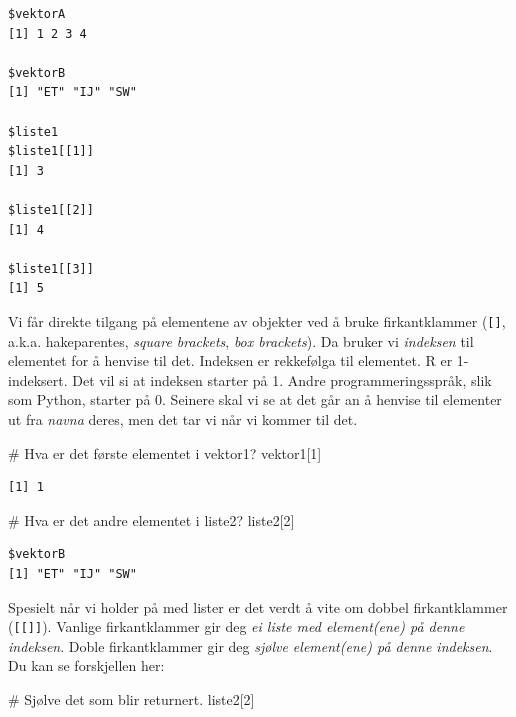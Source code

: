 \documentclass[
  letterpaper,
  DIV=11,
  numbers=noendperiod]{scrreprt}
\newenvironment{Shaded}{\begin{snugshade}}{\end{snugshade}}
\newcommand{\CommentTok}[1]{\textcolor[rgb]{0.37,0.37,0.37}{#1}}
\newcommand{\DecValTok}[1]{\textcolor[rgb]{0.68,0.00,0.00}{#1}}
\newcommand{\NormalTok}[1]{\textcolor[rgb]{0.00,0.23,0.31}{#1}}
\begin{document}
\begin{verbatim}
$vektorA
[1] 1 2 3 4

$vektorB
[1] "ET" "IJ" "SW"

$liste1
$liste1[[1]]
[1] 3

$liste1[[2]]
[1] 4

$liste1[[3]]
[1] 5
\end{verbatim}

Vi får direkte tilgang på elementene av objekter ved å bruke
firkantklammer (\texttt{{[}{]}}, a.k.a. hakeparentes, \emph{square
brackets}, \emph{box brackets}). Da bruker vi \emph{indeksen} til
elementet for å henvise til det. Indeksen er rekkefølga til elementet. R
er 1-indeksert. Det vil si at indeksen starter på 1. Andre
programmeringsspråk, slik som Python, starter på 0. Seinere skal vi se
at det går an å henvise til elementer ut fra \emph{navna} deres, men det
tar vi når vi kommer til det.

\begin{Shaded}
\begin{Highlighting}[]
\CommentTok{\# Hva er det første elementet i vektor1?}
\NormalTok{vektor1[}\DecValTok{1}\NormalTok{]}
\end{Highlighting}
\end{Shaded}

\begin{verbatim}
[1] 1
\end{verbatim}

\begin{Shaded}
\begin{Highlighting}[]
\CommentTok{\# Hva er det andre elementet i liste2?}
\NormalTok{liste2[}\DecValTok{2}\NormalTok{]}
\end{Highlighting}
\end{Shaded}

\begin{verbatim}
$vektorB
[1] "ET" "IJ" "SW"
\end{verbatim}

Spesielt når vi holder på med lister er det verdt å vite om dobbel
firkantklammer (\texttt{{[}{[}{]}{]}}). Vanlige firkantklammer gir deg
\emph{ei liste med element(ene) på denne indeksen}. Doble firkantklammer
gir deg \emph{sjølve element(ene) på denne indeksen}. Du kan se
forskjellen her:

\begin{Shaded}
\begin{Highlighting}[]
\CommentTok{\# Sjølve det som blir returnert.}
\NormalTok{liste2[}\DecValTok{2}\NormalTok{] }
\end{Highlighting}
\end{Shaded}
\end{document}
